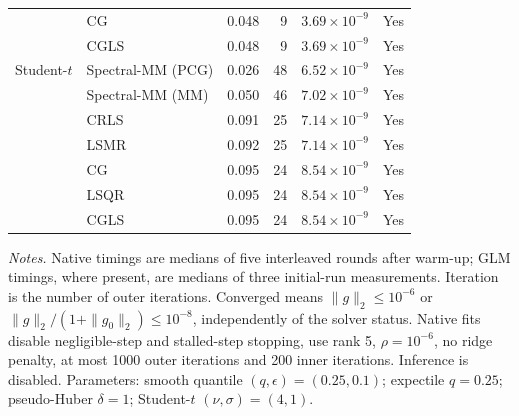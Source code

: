 \begin{longtable}{llrrrc}
 & CG & 0.048 & 9 & $3.69\times10^{-9}$ & Yes \\
 & CGLS & 0.048 & 9 & $3.69\times10^{-9}$ & Yes \\
\midrule
Student-$t$ & Spectral-MM (PCG) & 0.026 & 48 & $6.52\times10^{-9}$ & Yes \\
 & Spectral-MM (MM) & 0.050 & 46 & $7.02\times10^{-9}$ & Yes \\
 & CRLS & 0.091 & 25 & $7.14\times10^{-9}$ & Yes \\
 & LSMR & 0.092 & 25 & $7.14\times10^{-9}$ & Yes \\
 & CG & 0.095 & 24 & $8.54\times10^{-9}$ & Yes \\
 & LSQR & 0.095 & 24 & $8.54\times10^{-9}$ & Yes \\
 & CGLS & 0.095 & 24 & $8.54\times10^{-9}$ & Yes \\
\end{longtable}
\noindent\textit{Notes.} Native timings are medians of five interleaved rounds after warm-up; GLM timings, where present, are medians of three initial-run measurements. Iteration is the number of outer iterations. Converged means $\|g\|_2\leq10^{-6}$ or $\|g\|_2/(1+\|g_0\|_2)\leq10^{-8}$, independently of the solver status. Native fits disable negligible-step and stalled-step stopping, use rank 5, $\rho=10^{-6}$, no ridge penalty, at most 1000 outer iterations and 200 inner iterations. Inference is disabled.
Parameters: smooth quantile $(q,\epsilon)=(0.25,0.1)$; expectile $q=0.25$; pseudo-Huber $\delta=1$; Student-$t$ $(\nu,\sigma)=(4,1)$.
\par
\endgroup
